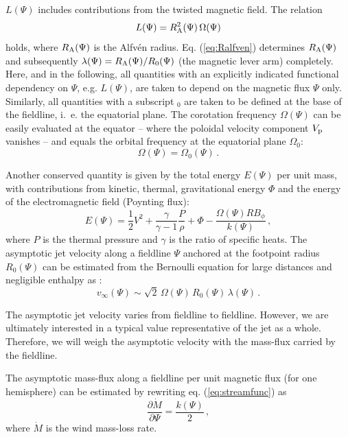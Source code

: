 \documentclass{emulateapj}
\begin{document}
$L(\Psi)$ includes contributions from the twisted magnetic
field.
The relation
%
\begin{equation} \label{eq:Ralfven}
  L(\Psi) = R^2_{\rm A}(\Psi) \, \Omega(\Psi) 
\end{equation}
%
holds, where $R_{\rm A}(\Psi)$ is the Alfv\'en radius. 
Eq. (\ref{eq:Ralfven}) 
determines $R_{\rm A}(\Psi)$ and subsequently
$\lambda(\Psi) = R_{\rm A}(\Psi)/R_0(\Psi)$ (the magnetic lever
arm) completely. 
Here, and in the
following, all quantities with an explicitly indicated functional
dependency on $\Psi$, e.g. $L(\Psi)$, are taken to depend on the magnetic
flux $\Psi$ only.  Similarly, all quantities with a subscript $_0$ are
taken to be defined at the base of the fieldline, i.~e. the equatorial
plane. The corotation frequency $\Omega(\Psi)$ can be easily
evaluated at the equator -- where the poloidal velocity component
$V_{\rm p}$ vanishes -- and equals the orbital
frequency at the equatorial plane $\Omega_0$:
%
\begin{equation} \label{eq:Omega_eq}
  \Omega(\Psi) = \Omega_0(\Psi) \,.
\end{equation}
%

Another conserved quantity is given by the total energy $E(\Psi)$
per unit mass, with
contributions from kinetic, thermal, gravitational energy $\Phi$ and the
energy of the electromagnetic field (Poynting flux):
%
\begin{equation} \label{eq:totenergy}
  E(\Psi) = \frac{1}{2} V^2 + \frac{\gamma}{\gamma-1} \frac{P}{\rho} 
         + \Phi - \frac{\Omega(\Psi) R B_\phi}{k(\Psi)} \,,
\end{equation}
%
where $P$ is the thermal pressure and $\gamma$ is the ratio of specific heats.
The asymptotic jet velocity along a fieldline $\Psi$ anchored at the
footpoint radius $R_0(\Psi)$ can be estimated from the 
Bernoulli equation for large distances and negligible enthalpy as \citep{mic69}:
%
\begin{equation} \label{eq:michel}
  v_{\infty}(\Psi)
  \sim \sqrt{2} \, \Omega(\Psi) \, R_0(\Psi) \, \lambda(\Psi) \,.
\end{equation}
%

The asymptotic jet velocity varies from fieldline to
fieldline. However, we are ultimately interested in a typical
value representative of the jet as a whole. Therefore, we will
weigh the asymptotic velocity with the mass-flux carried by the
fieldline. 

The asymptotic mass-flux along a fieldline per unit magnetic flux 
(for one hemisphere) can be estimated by rewriting eq. (\ref{eq:streamfunc}) as
%
\begin{equation} \label{eq:massflux}
   \frac{\partial\dot{M}}{\partial\Psi} 
   = \frac{k(\Psi)}{2} \,,
\end{equation}
%
where $\dot{M}$ is the wind mass-loss rate.
\end{document}
